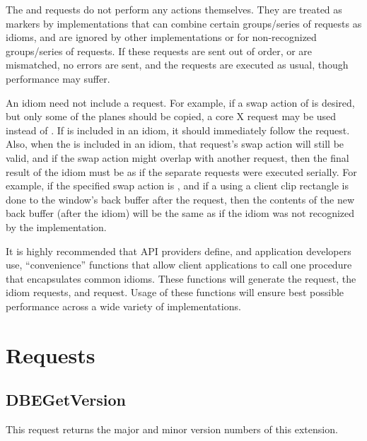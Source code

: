 The  and  requests
do not perform any actions themselves.  They are treated as markers by
implementations that can combine certain groups/series of requests as
idioms, and are ignored by other implementations or for non-recognized
groups/series of requests.  If these requests are sent out of order,
or are mismatched, no errors are sent, and the requests are executed
as usual, though performance may suffer.

An idiom need not include a  request.  For
example, if a swap action of  is desired, but only some of the
planes should be copied, a core X  request may
be used instead of .  If
 is included in an idiom, it should
immediately follow the  request.  Also,
when the  is included in an idiom, that
request's swap action will still be valid, and if the swap action
might overlap with another request, then the final result of the idiom
must be as if the separate requests were executed serially.  For
example, if the specified swap action is , and if a
 using a client clip rectangle is done
to the window's back buffer after the 
request, then the contents of the new back buffer (after the idiom)
will be the same as if the idiom was not recognized by the
implementation.

It is highly recommended that API providers define, and application
developers use, ``convenience'' functions that allow client
applications to call one procedure that encapsulates common idioms.
These functions will generate the  request,
the idiom requests, and  request.  Usage of
these functions will ensure best possible performance across a wide
variety of implementations.

\section{Requests}

\subsection{DBEGetVersion}

This request returns the major and minor version numbers of this
extension.

